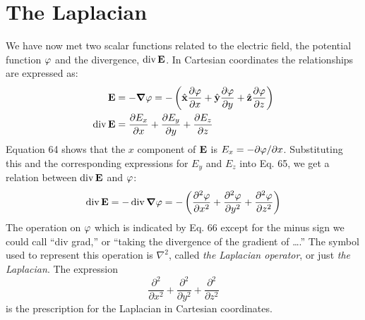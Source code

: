 \section{The Laplacian}

We have now met two scalar functions related to the electric field,
the potential function $\varphi$ and the divergence, $\operatorname{div}\mathbf{E}$. In Cartesian coordinates
the relationships are expressed as:
\begin{align}
  \mathbf{E} &= -\boldsymbol{\nabla}\varphi = -\left(\hat{\mathbf{x}}\frac{\partial\varphi}{\partial x}
                               +\hat{\mathbf{y}}\frac{\partial\varphi}{\partial y}
                               +\hat{\mathbf{z}}\frac{\partial\varphi}{\partial z}\right) \\
  \operatorname{div}\mathbf{E} &= \frac{\partial E_x}{\partial x}+\frac{\partial E_y}{\partial y}+\frac{\partial E_z}{\partial z}
\end{align}
Equation 64 shows that the $x$ component of $\mathbf{E}$ is $E_x=-\partial\varphi/\partial x$.
Substituting this and the corresponding expressions for $E_y$ and $E_z$
into Eq. 65, we get a relation between $\operatorname{div}\mathbf{E}$ and $\varphi$:
\begin{equation}
  \operatorname{div}\mathbf{E} = -\operatorname{div}\boldsymbol{\nabla}\varphi = -\left(\frac{\partial^2\varphi}{\partial x^2}+
                                       \frac{\partial^2\varphi}{\partial y^2}+
                                       \frac{\partial^2\varphi}{\partial z^2}\right)
\end{equation}
The operation on $\varphi$ which is indicated by Eq. 66 except for the minus
sign we could call ``div grad,'' or ``taking the divergence of the
gradient of \ldots .'' The symbol used to represent this operation is $\nabla^2$,
called \emph{the Laplacian operator}, or just \emph{the Laplacian}. The expression
\begin{equation*}
  \frac{\partial^2}{\partial x^2}+
                                       \frac{\partial^2}{\partial y^2}+
                                       \frac{\partial^2}{\partial z^2}
\end{equation*}
is the prescription for the Laplacian in Cartesian coordinates.

